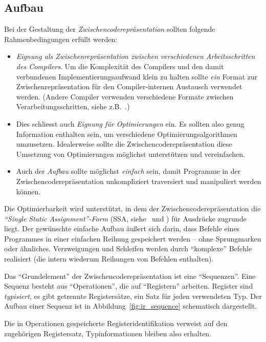 \documentclass[twoside,a4paper,fleqn,12pt]{book}
\begin{document}
\subsection{Aufbau}

Bei der Gestaltung der \emph{Zwischencoderepräsentation} sollten folgende Rahmenbedingungen erfüllt werden:
\begin{itemize}
\item \emph{Eignung als Zwischenrepräsentation zwischen verschiedenen Arbeitsschritten des Compilers}.
Um die Komplexität des Compilers und den damit verbundenen Implementierungsaufwand klein zu halten
sollte \emph{ein} Format zur Zwischenrepräsentation für den Compiler-internen Austausch verwendet werden.
(Andere Compiler verwenden verschiedene Formate zwischen Verarbeitungsschritten, siehe z.B.~\cite{SIMPLE}.)
\item Dies schliesst auch \emph{Eignung für Optimierungen} ein. Es sollten also genug Information enthalten sein,
um verschiedene Optimierungsalgorithmen umzusetzen. Idealerweise sollte die Zwischencoderepräsentation
diese Umsetzung von Optimierungen möglichst unterstützen und vereinfachen.
\item Auch der \emph{Aufbau} sollte möglichst \emph{einfach} sein, damit Programme in der Zwischencoderepräsentation 
unkompliziert traversiert und manipuliert werden können.
\end{itemize}

Die Optimierbarkeit wird unterstützt, in dem der Zwischencoderepräsentation die \emph{``Single Static Assignment''-Form} (SSA, siehe~\cite{ssa1} und \cite{ssa2})
für Ausdrücke zugrunde liegt. Der gewünschte einfache Aufbau äußert sich darin, dass Befehle eines Programmes
in einer einfachen Reihung gespeichert werden -- ohne Sprungmarken oder ähnliches. Verzweigungen und Schleifen werden
durch "`komplexe"' Befehle realisiert (die intern wiederum Reihungen von Befehlen enthalten).

Das "`Grundelement"' der Zwischencoderepräsentation ist eine "`Sequenzen"'. Eine Sequenz besteht aus "`Operationen"',
die auf "`Registern"' arbeiten. Register sind \emph{typisiert}, es gibt getrennte Registersätze, ein Satz für jeden verwendeten Typ. 
Der Aufbau einer Sequenz ist in Abbildung~\ref{fig:ir_sequence} schematisch dargestellt.

Die in Operationen gespeicherte Registeridentifikation verweist auf den zugehörigen Registersatz, Typinformationen bleiben also erhalten.
\end{document}
